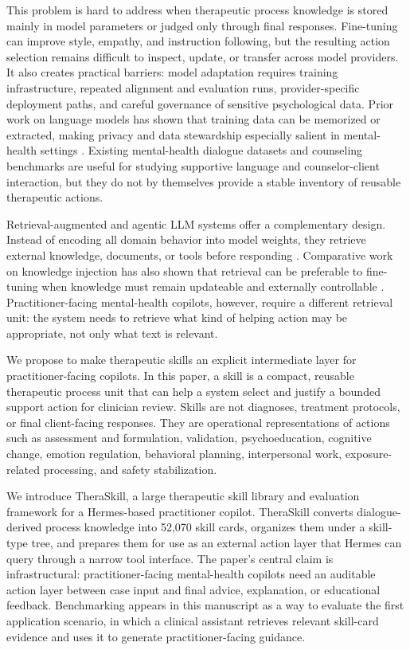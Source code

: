 \documentclass[11pt]{article}
\begin{document}
This problem is hard to address when therapeutic process knowledge is stored mainly in model parameters or judged only through final responses. Fine-tuning can improve style, empathy, and instruction following, but the resulting action selection remains difficult to inspect, update, or transfer across model providers. It also creates practical barriers: model adaptation requires training infrastructure, repeated alignment and evaluation runs, provider-specific deployment paths, and careful governance of sensitive psychological data. Prior work on language models has shown that training data can be memorized or extracted, making privacy and data stewardship especially salient in mental-health settings \citep{carlini2021extracting,carlini2023quantifying}. Existing mental-health dialogue datasets and counseling benchmarks are useful for studying supportive language and counselor-client interaction, but they do not by themselves provide a stable inventory of reusable therapeutic actions.

Retrieval-augmented and agentic LLM systems offer a complementary design. Instead of encoding all domain behavior into model weights, they retrieve external knowledge, documents, or tools before responding \citep{lewis2020rag,yao2023react,schick2023toolformer}. Comparative work on knowledge injection has also shown that retrieval can be preferable to fine-tuning when knowledge must remain updateable and externally controllable \citep{ouvadia2023finetuning}. Practitioner-facing mental-health copilots, however, require a different retrieval unit: the system needs to retrieve what kind of helping action may be appropriate, not only what text is relevant.

We propose to make therapeutic skills an explicit intermediate layer for practitioner-facing copilots. In this paper, a skill is a compact, reusable therapeutic process unit that can help a system select and justify a bounded support action for clinician review. Skills are not diagnoses, treatment protocols, or final client-facing responses. They are operational representations of actions such as assessment and formulation, validation, psychoeducation, cognitive change, emotion regulation, behavioral planning, interpersonal work, exposure-related processing, and safety stabilization.

We introduce TheraSkill, a large therapeutic skill library and evaluation framework for a Hermes-based practitioner copilot. TheraSkill converts dialogue-derived process knowledge into 52,070 skill cards, organizes them under a skill-type tree, and prepares them for use as an external action layer that Hermes can query through a narrow tool interface. The paper's central claim is infrastructural: practitioner-facing mental-health copilots need an auditable action layer between case input and final advice, explanation, or educational feedback. Benchmarking appears in this manuscript as a way to evaluate the first application scenario, in which a clinical assistant retrieves relevant skill-card evidence and uses it to generate practitioner-facing guidance.
\end{document}
